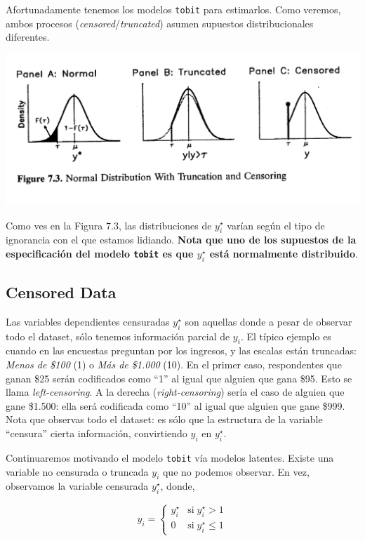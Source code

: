 \documentclass[onesided]{article}\usepackage[]{graphicx}\usepackage[]{color}
\makeatletter
\def\maxwidth{ %
  \ifdim\Gin@nat@width>\linewidth
    \linewidth
  \else
    \Gin@nat@width
  \fi
}
\makeatother
\begin{document}
Afortunadamente tenemos los modelos \texttt{tobit} para estimarlos. Como veremos, ambos procesos (\emph{censored}/\emph{truncated}) asumen supuestos distribucionales diferentes.

{\centering \includegraphics[width=\maxwidth]{fig_7_3.png}}

Como ves en la Figura 7.3, las distribuciones de $y^{\star}_{i}$ var\'ian seg\'un el tipo de ignorancia con el que estamos lidiando. {\bf Nota que uno de los supuestos de la especificaci\'on del modelo \texttt{tobit} es que $y^{\star}_{i}$ est\'a normalmente distribuido}.



\subsection{Censored Data}

Las variables dependientes censuradas $y^{\star}_{i}$ son aquellas donde a pesar de observar todo el dataset, s\'olo tenemos informaci\'on parcial de $y_{i}$. El t\'ipico ejemplo es cuando en las encuestas preguntan por los ingresos, y las escalas est\'an truncadas: \emph{Menos de \$100} (1) o \emph{M\'as de \$1.000} (10). En el primer caso, respondentes que ganan \$25 ser\'an codificados como ``1'' al igual que alguien que gana \$95. Esto se llama \emph{left-censoring}. A la derecha (\emph{right-censoring}) ser\'ia el caso de alguien que gane \$1.500: ella ser\'a codificada como ``10'' al igual que alguien que gane \$999. Nota que observas todo el dataset: es s\'olo que la estructura de la variable ``censura'' cierta informaci\'on, convirtiendo $y_{i}$ en $y_{i}^{\star}$.

Continuaremos motivando el modelo \texttt{tobit} v\'ia modelos latentes. Existe una variable no censurada o truncada $y_{i}$ que no podemos observar. En vez, observamos la variable censurada $y^{\star}_{i}$, donde,

\[
    y_{i}= 
\begin{cases}\label{censored:1}
    y_{i}^{\star} & \text{si} \; y_{i}^{\star} > 1 \\
    0           & \text{si} \; y_{i}^{\star} \leq 1
\end{cases}
\]
\end{document}
